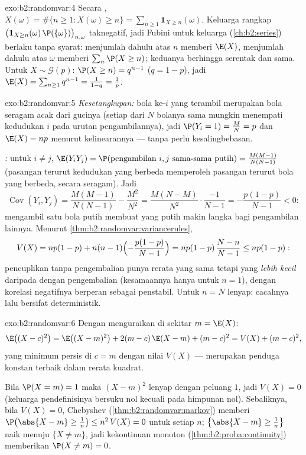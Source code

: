 \begin{solution}{exo:b2:randomvar:4}
Secara , $X(\omega) = \#\{n \geq 1 : X(\omega) \geq n\} =
\sum_{n\geq1}\mathbf{1}_{X \geq n}(\omega)$. Keluarga rangkap
$\bigl(\mathbf{1}_{X \geq n}(\omega)\,\P(\{\omega\})\bigr)_{n,
\omega}$ taknegatif, jadi Fubini untuk keluarga
(\cref{ch:b2:series}) berlaku tanpa syarat: menjumlah dahulu atas
$n$ memberi $\E(X)$, menjumlah dahulu atas $\omega$ memberi $\sum_n \P(X
\geq n)$; keduanya berhingga serentak dan sama. Untuk $X \sim
\mathcal{G}(p)$: $\P(X \geq n) = q^{n-1}$ ($q = 1-p$), jadi $\E(X) =
\sum_{n\geq1}q^{n-1} = \frac{1}{1 - q} = \frac1p$.
\end{solution}

\begin{solution}{exo:b2:randomvar:5}
\emph{Kesetangkupan:} bola ke-$i$ yang terambil merupakan bola
seragam acak dari gucinya (setiap dari $N$ bolanya sama mungkin
menempati kedudukan $i$ pada urutan pengambilannya), jadi $\P(Y_i = 1) = \frac MN =
p$ dan $\E(X) = np$ menurut kelinearannya --- tanpa perlu kesalingbebasan.

\emph{:} untuk $i \neq j$, $\E(Y_iY_j) = \P(\text{pengambilan }
i, j \text{ sama-sama putih}) = \frac{M(M-1)}{N(N-1)}$ (pasangan terurut
kedudukan yang berbeda memperoleh pasangan terurut bola yang berbeda,
secara seragam). Jadi
\[
\operatorname{Cov}(Y_i, Y_j)
= \frac{M(M-1)}{N(N-1)} - \frac{M^2}{N^2}
= \frac{M(N - M)}{N^2}\cdot\frac{-1}{N-1}
= -\frac{p(1-p)}{N-1} < 0 :
\]
mengambil satu bola putih membuat yang putih makin langka bagi pengambilan lainnya.
Menurut \cref{thm:b2:randomvar:variancerules},
\[
V(X) = np(1-p) + n(n-1)\Bigl(-\frac{p(1-p)}{N-1}\Bigr)
= np(1-p)\,\frac{N - n}{N - 1} \leq np(1-p) :
\]
pencuplikan tanpa pengembalian punya rerata yang sama tetapi  yang \emph{lebih kecil}
daripada dengan pengembalian (kesamaannya hanya untuk $n = 1$), dengan
korelasi negatifnya berperan sebagai penstabil. Untuk $n = N$
 lenyap: cacahnya lalu bersifat deterministik.
\end{solution}

\begin{solution}{exo:b2:randomvar:6}
Dengan menguraikan di sekitar $m = \E(X)$:
\[
\E\bigl((X - c)^2\bigr)
= \E\bigl((X - m)^2\bigr) + 2(m - c)\,\E(X - m) + (m - c)^2
= V(X) + (m - c)^2 ,
\]
yang minimum persis di $c = m$ dengan nilai $V(X)$ ---  merupakan
penduga konstan terbaik dalam rerata kuadrat.

Bila $\P(X = m) = 1$ maka $(X - m)^2$ lenyap dengan peluang
$1$, jadi $V(X) = 0$ (keluarga pendefinisinya bersuku nol kecuali pada
himpunan nol). Sebaliknya, bila $V(X) = 0$, Chebyshev
(\cref{thm:b2:randomvar:markov}) memberi $\P\bigl(\abs{X - m} \geq
\frac1n\bigr) \leq n^2\,V(X) = 0$ untuk setiap $n$; 
$\bigl\{\abs{X - m} \geq \frac1n\bigr\}$ naik menuju $\{X \neq
m\}$, jadi kekontinuan monoton (\cref{thm:b2:proba:continuity})
memberikan $\P(X \neq m) = 0$.
\end{solution}

